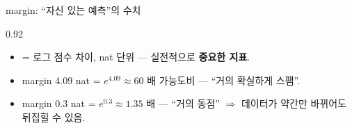 \begin{frame}{margin: ``자신 있는 예측''의 수치}
\begin{center}\begin{varwidth}{0.92\textwidth}
  \begin{itemize}
    \item {} = 로그 점수 차이, nat 단위 --- 실전적으로
      \textbf{중요한 지표}.
    \item margin 4.09 nat = $e^{4.09}\approx 60$ 배 가능도비 ---
      ``거의 확실하게 스팸''.
    \item margin 0.3 nat = $e^{0.3}\approx 1.35$ 배 --- ``거의
      동점'' $\Rightarrow$ 데이터가 약간만 바뀌어도 뒤집힐 수 있음.
    
    
  \end{itemize}
\end{varwidth}\end{center}
\end{frame}
